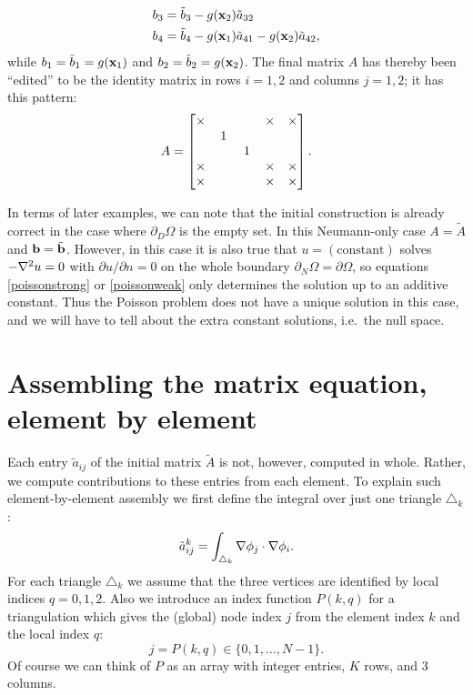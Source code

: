 \begin{example}
\begin{align*}
b_3 &= \tilde b_3 - g(\mathbf{x}_2) \tilde a_{32} \\
b_4 &= \tilde b_4 - g(\mathbf{x}_1) \tilde a_{41} - g(\mathbf{x}_2) \tilde a_{42},
\end{align*}
while $b_1=\tilde b_1=g(\mathbf{x}_1)$ and $b_2 = \tilde b_2 = g(\mathbf{x}_2)$.  The final matrix $A$ has thereby been ``edited'' to be the identity matrix in rows $i=1,2$ and columns $j=1,2$; it has this pattern:
\begin{equation*}
A = \begin{bmatrix}
\times & & & \times & \times \\
 & \,1\, & & & \\
 & & \,1\, & & \\
\times & & & \times & \times \\
\times & & & \times & \times
\end{bmatrix}.
\end{equation*}
\end{example}
\noindent\hrulefill

\bigskip

In terms of later examples, we can note that the initial construction is already correct in the case where $\partial_D \Omega$ is the empty set.  In this Neumann-only case $A=\tilde A$ and $\mathbf{b} = \tilde {\mathbf{b}}$.  However, in this case it is also true that $u=(\text{constant})$ solves $-\nabla^2 u=0$ with $\partial u/\partial n = 0$ on the whole boundary $\partial_N \Omega = \partial \Omega$, so equations \eqref{poissonstrong} or \eqref{poissonweak} only determines the solution up to an additive constant.  Thus the Poisson problem does not have a unique solution in this case, and we will have to tell \PETSc about the extra constant solutions, i.e.~the null space.


\section{Assembling the matrix equation, element by element}

Each entry $\tilde a_{ij}$ of the initial matrix $\tilde A$ is not, however, computed in whole.  Rather, we compute contributions to these entries from each element.  To explain such element-by-element assembly we first define the integral over just one triangle $\triangle_k$:
    $$\tilde a_{ij}^k = \int_{\triangle_k} \nabla \phi_j \cdot \nabla \phi_i.$$
For each triangle $\triangle_k$ we assume that the three vertices are identified by local indices $q=0,1,2$.  Also we introduce an index function $P(k,q)$ for a triangulation which gives the (global) node index $j$ from the element index $k$ and the local index $q$:
    $$j=P(k,q) \in \{0,1,\dots,N-1\}.$$
Of course we can think of $P$ as an array with integer entries, $K$ rows, and 3 columns.

